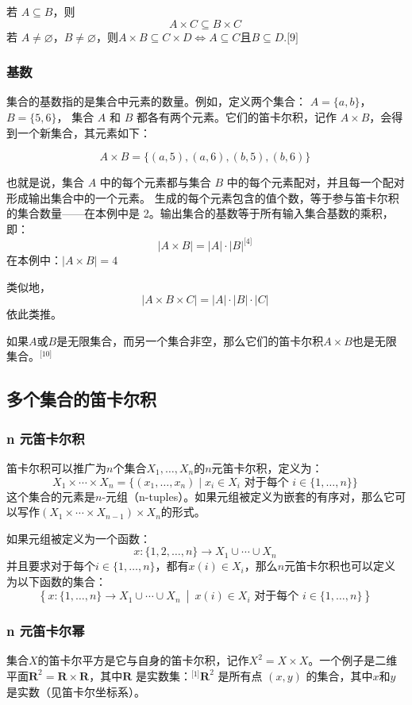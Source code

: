 若 \( A \subseteq B \)，则  
  \[
  A \times C \subseteq B \times C~
  \]
若 \( A \ne \varnothing \)，\( B \ne \varnothing \)，则\(A\times B \subseteq C \times D \iff A \subseteq C\)且\(B \subseteq D\).\(\text{[9]}\)
\subsubsection{基数}  
集合的基数指的是集合中元素的数量。例如，定义两个集合：  
\( A = \{a, b\} \)，\( B = \{5, 6\} \)，  
集合 \( A \) 和 \( B \) 都各有两个元素。它们的笛卡尔积，记作 \( A \times B \)，会得到一个新集合，其元素如下：

\[
A \times B = \{(a,5), (a,6), (b,5), (b,6)\}~
\]

也就是说，集合 \( A \) 中的每个元素都与集合 \( B \) 中的每个元素配对，并且每一个配对形成输出集合中的一个元素。  
生成的每个元素包含的值个数，等于参与笛卡尔积的集合数量——在本例中是 2。输出集合的基数等于所有输入集合基数的乘积，即：
\[
|A \times B| = |A| \cdot |B|^\text{[4]}~
\]
在本例中：\(|A \times B| = 4\)

类似地，
\[
|A \times B \times C| = |A| \cdot |B| \cdot |C|~
\]
依此类推。

如果\( A \)或\( B \)是无限集合，而另一个集合非空，那么它们的笛卡尔积\( A \times B \)也是无限集合。\(^\text{[10]}\)

\subsection{多个集合的笛卡尔积} 
\subsubsection{n 元笛卡尔积}
笛卡尔积可以推广为\( n \)个集合\( X_1, \dots, X_n \)的\(n\)元笛卡尔积，定义为：
\[
X_1 \times \cdots \times X_n = \{(x_1, \dots, x_n) \mid x_i \in X_i \text{ 对于每个 } i \in \{1, \dots, n\} \}~
\]
这个集合的元素是\( n \)-元组（n-tuples）。如果元组被定义为嵌套的有序对，那么它可以写作\((X_1 \times \cdots \times X_{n-1}) \times X_n\)的形式。

如果元组被定义为一个函数：  
\[
x: \{1, 2, \dots, n\} \to X_1 \cup \cdots \cup X_n~
\]  
并且要求对于每个\( i \in \{1, \dots, n\} \)，都有\( x(i) \in X_i \)，那么\(n\)元笛卡尔积也可以定义为以下函数的集合：
\[
\left\{ x: \{1, \dots, n\} \to X_1 \cup \cdots \cup X_n\ \middle|\ x(i) \in X_i \text{ 对于每个 } i \in \{1, \dots, n\} \right\}~
\]
\subsubsection{n 元笛卡尔幂}
集合\( X \)的笛卡尔平方是它与自身的笛卡尔积，记作\( X^2 = X \times X \)。一个例子是二维平面\( \mathbf{R}^2 = \mathbf{R} \times \mathbf{R} \)，其中\( \mathbf{R} \) 是实数集：\(^\text{[1]}\)\( \mathbf{R}^2 \) 是所有点 \( (x, y) \) 的集合，其中\( x \)和\( y \)是实数（见笛卡尔坐标系）。

